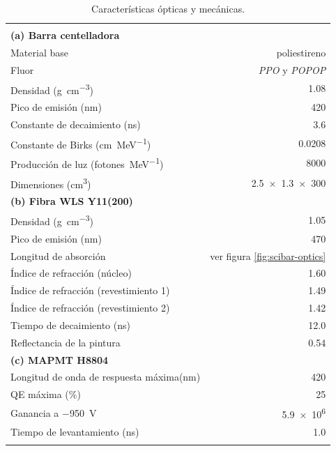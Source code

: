 \begin{table}
\caption{Características ópticas y mecánicas.}
\label{table:optics}

\begin{tabular}{lr}

\multicolumn{2}{c}{}\\
\cmidrule(r){1-2}
\addlinespace[5pt]
\textbf{(a) Barra centelladora}\\
\addlinespace[5pt]
\cmidrule(r){1-2}
Material base & poliestireno\\
Fluor & \emph{PPO} y \emph{POPOP}\\
Densidad (\si{\gram\per\cubic\cm}) & \num{1.08}\\
Pico de emisión (\si{\nm}) & \num{420}\\
Constante de decaimiento (\si{\ns}) & \num{3.6}\\
Constante de Birks (\si{\cm\per\mega\electronvolt}) & \num{0.0208}\\
Producción de luz (\si{fotones\per\mega\electronvolt}) & \num{8000}\\
Dimensiones (\si{\cubic\cm}) & \num[product-units=power]{2.5x1.3x300}\\
\addlinespace[10pt]
\textbf{(b) Fibra WLS Y11(200)}\\
\addlinespace[5pt]
\cmidrule(r){1-2}
Densidad (\si{\gram\per\cubic\cm}) & \num{1.05}\\
Pico de emisión (\si{\nm}) & \num{470}\\
Longitud de absorción & ver figura \ref{fig:scibar-optics}\\
Índice de refracción (núcleo) & \num{1.60}\\
Índice de refracción (revestimiento 1) & \num{1.49}\\
Índice de refracción (revestimiento 2) & \num{1.42}\\
Tiempo de decaimiento (\si{\ns}) & \num{12.0}\\
Reflectancia de la pintura & 0.54\\
\addlinespace[10pt]
\textbf{(c) MAPMT H8804}\\
\addlinespace[5pt]
\cmidrule(r){1-2}
Longitud de onda de respuesta máxima(\si{\nm}) & \num{420}\\
QE máxima (\si{\percent})  & \num{25}\\
Ganancia a \SI{-950}{\volt} & \num{5.9e6}\\
Tiempo de levantamiento (\si{\ns}) & \num{1.0}\\
\addlinespace[5pt]
\bottomrule

\end{tabular}
\end{table}

